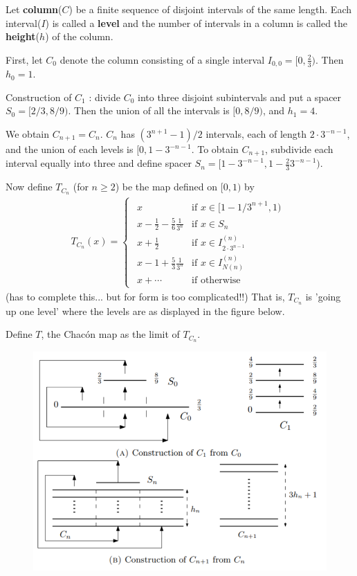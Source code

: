 \documentclass[10pt,a4paper]{report}
\begin{document}
Let \textbf{column}($C$) be a finite sequence of disjoint intervals of the same length. Each interval($I$) is called a \textbf{level} and the number of intervals in a column is called the \textbf{height}($h$) of the column.
\s

First, let $C_0$ denote the column consisting of a single interval $I_{0,0} = [0,\frac{2}{3})$. Then $h_0 =1$.
\s

Construction of $C_1$ : divide $C_0$ into three disjoint subintervals and put a spacer $S_0 = [2/3, 8/9)$. Then the union of all the intervals is $[0,8/9)$, and $h_1 =4$.
\s

We obtain $C_{n+1} = C_{n}$. $C_n$ has $(3^{n+1}-1)/2$ intervals, each of length $2\cdot 3^{-n-1}$, and the union of each levels is $[0,1-3^{-n-1}$. To obtain $C_{n+1}$, subdivide each interval equally into three and define spacer $S_n = [1-3^{-n-1},1- \frac{2}{3}3^{-n-1})$.
\s

Now define $T_{C_n}$ (for $n\geq 2$) be the map defined on $[0,1)$ by
\begin{align*}
T_{C_n}(x) = \begin{cases} \begin{array}{cl}
x & \text{if } x\in [1-1/3^{n+1},1) \\
x - \frac{1}{2} - \frac{5}{6} \frac{1}{3^n} & \text{if } x\in S_n \\
x + \frac{1}{2} & \text{if } x\in I^{(n)}_{2\cdot 3^{n-1}} \\
x- 1 + \frac{5}{3} \frac{1}{3^n} & \text{if } x\in I^{(n)}_{N(n)} \\
x + \cdots & \text{if otherwise}  
\end{array}
\end{cases}
\end{align*}
(has to complete this... but for form is too complicated!!) That is, $T_{C_n}$ is 'going up one level' where the levels are as displayed in the figure below.
\s

Define $T$, the Chac\'{o}n map as the limit of $T_{C_n}$.

\begin{figure}[h]
	\centering
	\includegraphics[scale=0.66]{2}
\end{figure}
\s
\end{document}
